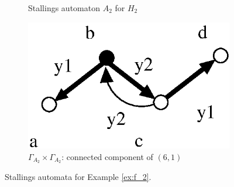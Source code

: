\documentclass[a4paper,12pt]{article}
\newcommand{\G}{\Gamma }
\numberwithin{equation}{section}
\numberwithin{figure}{section}
\begin{document}
\begin{figure}
\begin{center}
\begin{subfigure}[b]{.3\columnwidth}
\caption{Stallings automaton $A_2$ for $H_2$}
\label{fig:stallh2}
\end{subfigure}
\hspace{25mm}
\begin{subfigure}[b]{.3\columnwidth}
\includegraphics[scale=.52]{G2xG2-1.eps}
\caption{$\G_{A_2}\times \G_{A_2}$: connected component of $(6,1)$}
\label{fig:G2xG2-1}
\end{subfigure}
\end{center}
\caption{Stallings automata for Example \ref{ex:f_2}.}\label{fig:stallagain}
\end{figure}
\end{document}
